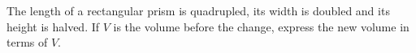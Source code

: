 The length of a rectangular prism is quadrupled, its width is doubled and its height is halved. If $V$ is the volume before the change, express the new volume in terms of $V$.
